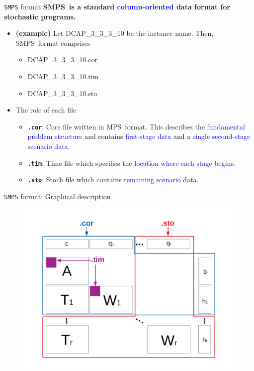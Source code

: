 \documentclass{beamer}
\newcommand{\smps}{\textsf{SMPS}}
\newcommand{\mps}{\textsf{MPS}}
\begin{document}
	\begin{frame}{\texttt{SMPS} format}
		\textbf{\smps\ is a standard \textcolor{blue}{column-oriented} data format for stochastic programs.} 
		\begin{itemize}
			\item \textbf{(example)} Let DCAP\_3\_3\_3\_10 be the instance name. Then, \smps\ format comprises
			\begin{itemize}
				\item DCAP\_3\_3\_3\_10.cor
				\item DCAP\_3\_3\_3\_10.tim
				\item DCAP\_3\_3\_3\_10.sto
			\end{itemize}
			\item The role of each file
			\begin{itemize}
				\item \textbf{\texttt{.cor}}: Core file written in \mps\ format. This describes the \textcolor{blue}{fundamental problem structure} and contains \textcolor{blue}{first-stage data} and \textcolor{blue}{a single second-stage scenario data.}
				\item \textbf{\texttt{.tim}}: Time file which specifies \textcolor{blue}{the location where each stage begins.}
				\item \textbf{\texttt{.sto}}: Stoch file which contains \textcolor{blue}{remaining scenario data.}
			\end{itemize}
		\end{itemize}
	\end{frame}
	
	\begin{frame}{\texttt{SMPS} format: Graphical description}
		\vspace{-0.35cm}
		\begin{figure}
			\begin{center}
				\includegraphics[width=\textwidth]{SMPS_description_slide}
			\end{center}
		\end{figure}
	\end{frame}
\end{document}
